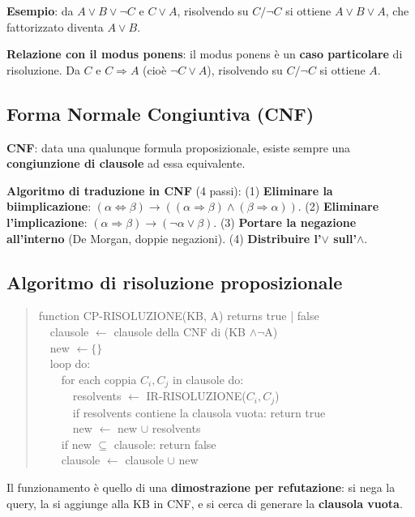 \documentclass[11pt,a4paper]{report}
\begin{document}
\textbf{Esempio}: da $A\vee B\vee\neg C$ e $C\vee A$, risolvendo su $C/\neg C$ si ottiene $A\vee B\vee A$, che fattorizzato diventa $A\vee B$.

\textbf{Relazione con il modus ponens}: il modus ponens è un \textbf{caso particolare} di risoluzione. Da $C$ e $C\Rightarrow A$ (cioè $\neg C\vee A$), risolvendo su $C/\neg C$ si ottiene $A$.

\subsection*{Forma Normale Congiuntiva (CNF)}

\textbf{CNF}: data una qualunque formula proposizionale, esiste sempre una \textbf{congiunzione di clausole} ad essa equivalente.

\textbf{Algoritmo di traduzione in CNF} (4 passi): (1) \textbf{Eliminare la biimplicazione}: $(\alpha\Leftrightarrow\beta) \to ((\alpha\Rightarrow\beta)\wedge(\beta\Rightarrow\alpha))$. (2) \textbf{Eliminare l'implicazione}: $(\alpha\Rightarrow\beta) \to (\neg\alpha\vee\beta)$. (3) \textbf{Portare la negazione all'interno} (De Morgan, doppie negazioni). (4) \textbf{Distribuire l'$\vee$ sull'$\wedge$}.

\subsection*{Algoritmo di risoluzione proposizionale}

\begin{quote}
\ttfamily
function CP-RISOLUZIONE(KB, A) returns true | false\\
\ \ clausole $\leftarrow$ clausole della CNF di (KB $\wedge \neg$A)\\
\ \ new $\leftarrow \{\}$\\
\ \ loop do:\\
\ \ \ \ for each coppia $C_i, C_j$ in clausole do:\\
\ \ \ \ \ \ resolvents $\leftarrow$ IR-RISOLUZIONE($C_i, C_j$)\\
\ \ \ \ \ \ if resolvents contiene la clausola vuota: return true\\
\ \ \ \ \ \ new $\leftarrow$ new $\cup$ resolvents\\
\ \ \ \ if new $\subseteq$ clausole: return false\\
\ \ \ \ clausole $\leftarrow$ clausole $\cup$ new
\end{quote}

Il funzionamento è quello di una \textbf{dimostrazione per refutazione}: si nega la query, la si aggiunge alla KB in CNF, e si cerca di generare la \textbf{clausola vuota}.
\end{document}
